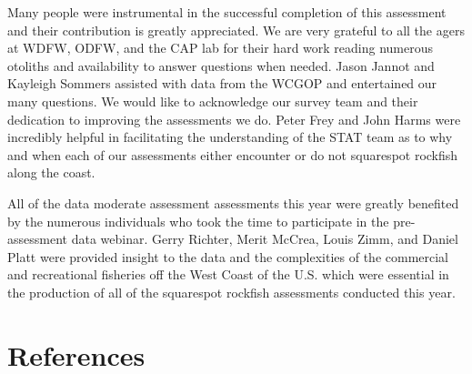 \documentclass[11pt,
  english,
  a4paper,
]{article}
\begin{document}
Many people were instrumental in the successful completion of this assessment and their contribution is greatly appreciated. We are very grateful to all the agers at WDFW, ODFW, and the CAP lab for their hard work reading numerous otoliths and availability to answer questions when needed. Jason Jannot and Kayleigh Sommers assisted with data from the WCGOP and entertained our many questions. We would like to acknowledge our survey team and their dedication to improving the assessments we do. Peter Frey and John Harms were incredibly helpful in facilitating the understanding of the STAT team as to why and when each of our assessments either encounter or do not squarespot rockfish along the coast.

\leavevmode\tagmcend\tagstructend\par


All of the data moderate assessment assessments this year were greatly benefited by the numerous individuals who took the time to participate in the pre-assessment data webinar. Gerry Richter, Merit McCrea, Louis Zimm, and Daniel Platt were provided insight to the data and the complexities of the commercial and recreational fisheries off the West Coast of the U.S. which were essential in the production of all of the squarespot rockfish assessments conducted this year.

\leavevmode\tagmcend\tagstructend\par

\newpage

\clearpage


\hypertarget{references}{%
\section{References}\label{references}}

\leavevmode\tagmcend\tagstructend

\end{document}
